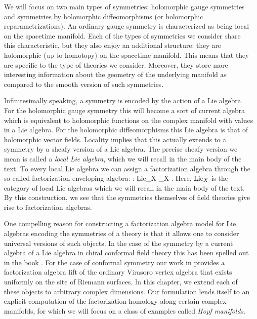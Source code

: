 We will focus on two main types of symmetries: holomorphic gauge symmetries and symmetries by holomorphic diffeomorphisms (or holomorphic reparametrizations). 
An ordinary gauge symmetry is characterized as being local on the spacetime manifold. 
Each of the types of symmetries we consider share this characteristic, but they also enjoy an additional structure: they are holomorphic (up to homotopy) on the spacetime manifold. 
This means that they are specific to the type of theories we consider.
Moreover, they store more interesting information about the geometry of the underlying manifold as compared to the smooth version of such symmetries.

Infinitesimally speaking, a symmetry is encoded by the action of a Lie algebra.
For the holomorphic gauge symmetry this will become a sort of current algebra which is equivalent to holomorphic functions on the complex manifold with values in a Lie algebra.
For the holomorphic diffeomorphisms this Lie algebra is that of holomorphic vector fields.
Locality implies that this actually extends to a symmetry by a sheafy version of a Lie algebra. 
The precise sheafy version we mean is called a {\em local Lie algebra}, which we will recall in the main body of the text. 
To every local Lie algebra we can assign a factorization algebra through the so-called factorization enveloping algebra:
\ben
{} : {\rm Lie}_X _X .
\een
Here, ${\rm Lie}_X$ is the category of local Lie algebras which we will recall in the main body of the text.
By this construction, we see that the symmetries themselves of field theories give rise to factorization algebras. 

One compelling reason for constructing a factorization algebra model for Lie algebras encoding the symmetries of a theory is that it allows one to consider universal versions of such objects.
In the case of the symmetry by a current algebra of a Lie algebra in chiral conformal field theory this has been spelled out in the book \cite{CG1}. 
For the case of conformal symmetry our work in \cite{BWVir} provides a factorization algebra lift of the ordinary Virasoro vertex algebra that exists uniformly on the site of Riemann surfaces. 
In this chapter, we extend each of these objects to arbitrary complex dimensions.
Our formulation lends itself to an explicit computation of the factorization homology along certain complex manifolds, for which we will focus on a class of examples called {\em Hopf manifolds}.

